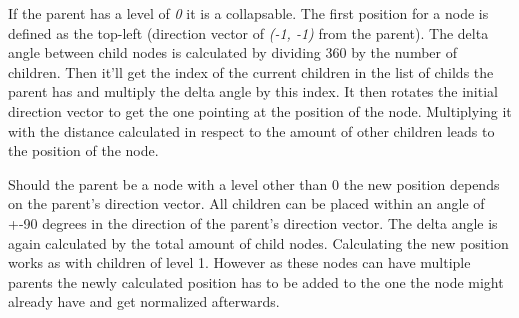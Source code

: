 If the parent has a level of \emph{0} it is a collapsable. The first position for a node is defined as the top-left (direction vector of \emph{(-1, -1)} from the parent). The delta angle between child nodes is calculated by dividing 360 by the number of children. Then it'll get the index of the current children in the list of childs the parent has and multiply the delta angle by this index. It then rotates the initial direction vector to get the one pointing at the position of the node. Multiplying it with the distance calculated in respect to the amount of other children leads to the position of the node.

Should the parent be a node with a level other than 0 the new position depends on the parent's direction vector. All children can be placed within an angle of +-90 degrees in the direction of the parent's direction vector. The delta angle is again calculated by the total amount of child nodes. Calculating the new position works as with children of level 1. However as these nodes can have multiple parents the newly calculated position has to be added to the one the node might already have and get normalized afterwards. \\

